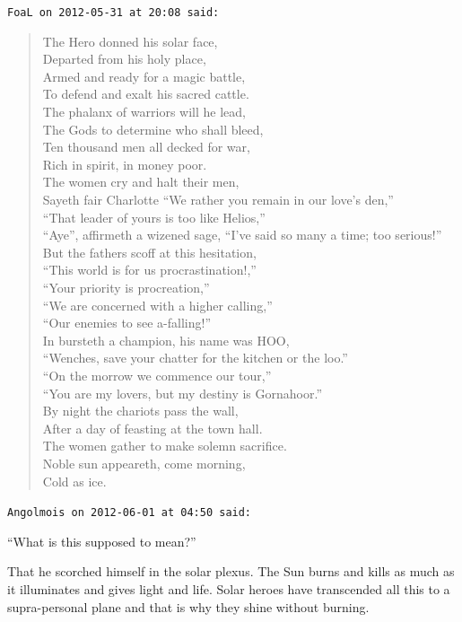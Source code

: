 \begin{footnotesize}
\begin{sffamily}
\texttt{FoaL on 2012-05-31 at 20:08 said:}
\begin{verse}
The Hero donned his solar face,\\
Departed from his holy place,\\
Armed and ready for a magic battle,\\
To defend and exalt his sacred cattle.\\
The phalanx of warriors will he lead,\\
The Gods to determine who shall bleed,\\
Ten thousand men all decked for war,\\
Rich in spirit, in money poor.\\
The women cry and halt their men,\\
Sayeth fair Charlotte ``We rather you remain in our love's den,''\\
``That leader of yours is too like Helios,''\\
``Aye'', affirmeth a wizened sage, ``I've said so many a time; too serious!''\\
But the fathers scoff at this hesitation,\\
``This world is for us procrastination!,''\\
``Your priority is procreation,''\\
``We are concerned with a higher calling,''\\
``Our enemies to see a-falling!''\\
In bursteth a champion, his name was HOO,\\
``Wenches, save your chatter for the kitchen or the loo.''\\
``On the morrow we commence our tour,''\\
``You are my lovers, but my destiny is Gornahoor.''\\
By night the chariots pass the wall,\\
After a day of feasting at the town hall.\\
The women gather to make solemn sacrifice.\\
Noble sun appeareth, come morning,\\
Cold as ice.
\end{verse}

\hfill

\texttt{Angolmois on 2012-06-01 at 04:50 said:}

``What is this supposed to mean?''

That he scorched himself in the solar plexus. The Sun burns and kills as much as it illuminates and gives light and life. Solar heroes have transcended all this to a supra-personal plane and that is why they shine without burning.


\end{sffamily}
\end{footnotesize}
